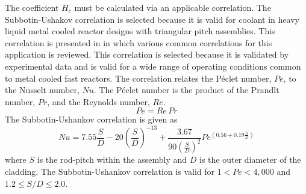       The coefficient $H_c$ must be calculated via an applicable correlation.
      The Subbotin-Ushakov correlation is selected because it is valid for 
      coolant in heavy liquid metal cooled reactor designs with triangular 
      pitch assemblies. This correlation is presented in \cite{subbotinUshakov}
      in which various common correlations for this application is reviewed.
      This correlation is selected because it is validated by experimental data
      and is valid for a wide range of operating conditions common to metal 
      cooled fast reactors. The correlation relates the P\'eclet number, $Pe$,
      to the Nusselt number, $Nu$. The P\'eclet number is the product of the 
      Prandlt number, $Pr$, and the Reynolds number, $Re$.
      \begin{equation}
        \label{eq:peclet}
        Pe = Re \, Pr
      \end{equation}
      The Subbotin-Ushankov correlation is given as
      \begin{equation}
        \label{eq:subbotinUshakov}
        Nu = 7.55 \frac{S}{D} - 20 \left(\frac{S}{D}\right)^{-13} + 
          \frac{3.67}{90\left(\frac{S}{D}\right)^{2}}
          Pe^{\left(0.56 + 0.19 \frac{S}{D}\right)}
      \end{equation}
      where $S$ is the rod-pitch within the assembly and $D$ is the outer 
      diameter of the cladding. The Subbotin-Ushankov correlation is valid for
      ${ 1 < Pe < 4,000 }$ and ${1.2 \le S/D \le 2.0}$.

